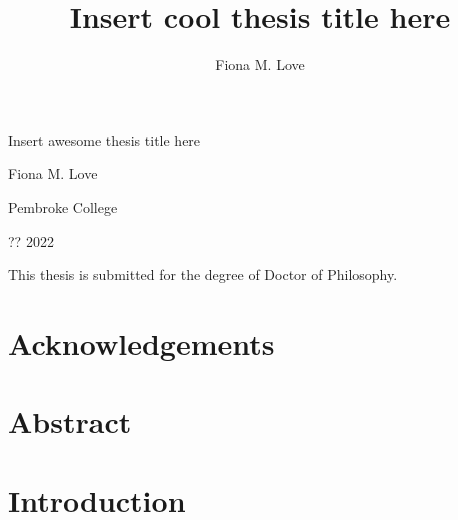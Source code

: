 \documentclass[
]{book}
\title{Insert cool thesis title here}
\author{Fiona M. Love}
\date{}
\begin{document}
\maketitle

\begin{titlepage}
\begin{center}

  \hspace{0pt}
  \vfill
  
  {\Huge
  Insert awesome thesis title here
  }\par
  
  {\Large
  Fiona M. Love
  }\par
  
   \vspace{1\baselineskip}
  
  {Pembroke College}\par
  {?? 2022}\par
  
  \vspace{4\baselineskip}
  
  {This thesis is submitted for the degree of Doctor of Philosophy.}\par
  
  \vfill
  \hspace{0pt}

\end{center}
\end{titlepage}

\hypertarget{ACKNOWLEDGEMENTS}{%
\chapter*{Acknowledgements}\label{ACKNOWLEDGEMENTS}}


\hypertarget{ABSTRACT}{%
\chapter*{Abstract}\label{ABSTRACT}}



\tableofcontents

\hypertarget{INTRODUCTION}{%
\chapter*{Introduction}\label{INTRODUCTION}}
\end{document}
